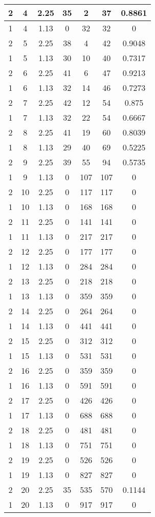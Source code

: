 \documentclass[letterpaper, 12pt]{article}
\begin{document}
\begin{longtable}{|c|c|c|c|c|c|c|}
\hline
2 & 4 & 2.25 & 35 & 2 & 37 & 0.8861 \\
\hline
1 & 4 & 1.13 & 0 & 32 & 32 & 0 \\
\hline
2 & 5 & 2.25 & 38 & 4 & 42 & 0.9048 \\
\hline
1 & 5 & 1.13 & 30 & 10 & 40 & 0.7317 \\
\hline
2 & 6 & 2.25 & 41 & 6 & 47 & 0.9213 \\
\hline
1 & 6 & 1.13 & 32 & 14 & 46 & 0.7273 \\
\hline
2 & 7 & 2.25 & 42 & 12 & 54 & 0.875 \\
\hline
1 & 7 & 1.13 & 32 & 22 & 54 & 0.6667 \\
\hline
2 & 8 & 2.25 & 41 & 19 & 60 & 0.8039 \\
\hline
1 & 8 & 1.13 & 29 & 40 & 69 & 0.5225 \\
\hline
2 & 9 & 2.25 & 39 & 55 & 94 & 0.5735 \\
\hline
1 & 9 & 1.13 & 0 & 107 & 107 & 0 \\
\hline
2 & 10 & 2.25 & 0 & 117 & 117 & 0 \\
\hline
1 & 10 & 1.13 & 0 & 168 & 168 & 0 \\
\hline
2 & 11 & 2.25 & 0 & 141 & 141 & 0 \\
\hline
1 & 11 & 1.13 & 0 & 217 & 217 & 0 \\
\hline
2 & 12 & 2.25 & 0 & 177 & 177 & 0 \\
\hline
1 & 12 & 1.13 & 0 & 284 & 284 & 0 \\
\hline
2 & 13 & 2.25 & 0 & 218 & 218 & 0 \\
\hline
1 & 13 & 1.13 & 0 & 359 & 359 & 0 \\
\hline
2 & 14 & 2.25 & 0 & 264 & 264 & 0 \\
\hline
1 & 14 & 1.13 & 0 & 441 & 441 & 0 \\
\hline
2 & 15 & 2.25 & 0 & 312 & 312 & 0 \\
\hline
1 & 15 & 1.13 & 0 & 531 & 531 & 0 \\
\hline
2 & 16 & 2.25 & 0 & 359 & 359 & 0 \\
\hline
1 & 16 & 1.13 & 0 & 591 & 591 & 0 \\
\hline
2 & 17 & 2.25 & 0 & 426 & 426 & 0 \\
\hline
1 & 17 & 1.13 & 0 & 688 & 688 & 0 \\
\hline
2 & 18 & 2.25 & 0 & 481 & 481 & 0 \\
\hline
1 & 18 & 1.13 & 0 & 751 & 751 & 0 \\
\hline
2 & 19 & 2.25 & 0 & 526 & 526 & 0 \\
\hline
1 & 19 & 1.13 & 0 & 827 & 827 & 0 \\
\hline
2 & 20 & 2.25 & 35 & 535 & 570 & 0.1144 \\
\hline
1 & 20 & 1.13 & 0 & 917 & 917 & 0 \\
\hline
\end{longtable}
\end{document}
